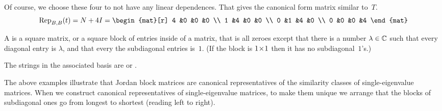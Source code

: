 \begin{example}
\begin{equation*}
\end{equation*}
Of course, we choose these four to not have any linear dependences.
That gives the canonical form matrix similar to~$T$.
\begin{equation*}
  \rep{t}{B,B}
  =N+4I=
  \begin{mat}[r]
    4  &0  &0  &0   \\
    1  &4  &0  &0   \\
    0  &1  &4  &0   \\
    0  &0  &0  &4
   \end{mat}
\end{equation*}
\end{example}

\begin{definition}  \label{def:JordanBlock}
A 
is a square matrix, or a square block of entries inside of a matrix,
that is all zeroes except that 
there is a number $\lambda\in\mathbb{C}$ such that 
every diagonal entry is $\lambda$,
and that every the subdiagonal entries is~$1$.
(If the block is $1 \! \times \! 1$ then it has no subdiagonal~$1$'s.)
\end{definition}

The strings in the associated basis are 
or .

The above examples illustrate that Jordan block matrices are
canonical representatives of the similarity classes of single-eigenvalue
matrices.
When we construct canonical representatives of single-eigenvalue matrices,
to make them unique we arrange that the blocks of subdiagonal ones go from
longest to shortest (reading left to right).

